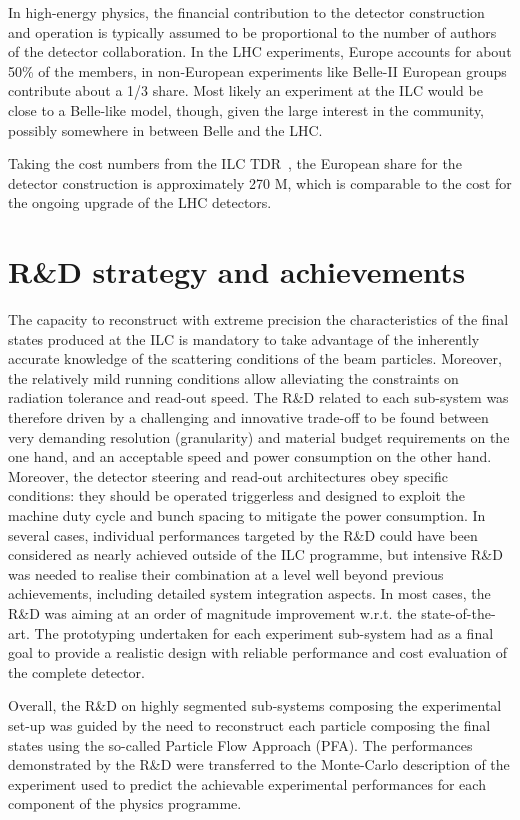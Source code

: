 \documentclass[%
 reprint,
 amsmath,amssymb,
 aps,
]{revtex4-1}
\begin{document}
In high-energy physics, the financial contribution to the detector
construction and operation
is typically assumed to be proportional to the number of authors of
the detector collaboration. In the LHC experiments, Europe accounts for about 50\% of the members, in non-European experiments like Belle-II European groups contribute about a 1/3 share. Most likely an experiment at the ILC would be close to a Belle-like model, though, given the large interest in the community, possibly somewhere in between Belle and the LHC. 

Taking
the cost numbers from
the ILC TDR~\cite{ILC-TDR}, the European share for the detector
construction is approximately 270 M\Euro{}, which is comparable to the cost for the ongoing upgrade of the LHC detectors.

\section{\label{sec:RandD}R\&D strategy and achievements}

The capacity to reconstruct with extreme precision the characteristics of the ﬁnal states produced at the ILC is mandatory to take advantage of the inherently accurate knowledge of the scattering conditions of the beam particles. Moreover, the relatively mild running conditions allow alleviating the constraints on radiation tolerance and read-out speed. The R\&D related to each sub-system was therefore driven by a challenging and innovative trade-oﬀ to be found between very demanding resolution (granularity) and material budget requirements on the one hand, and an acceptable speed and power consumption on the other hand. Moreover, the detector steering and read-out architectures obey speciﬁc conditions: they should be operated triggerless and designed to exploit the machine duty cycle and bunch spacing to mitigate the power consumption.
In several cases, individual performances targeted by the R\&D could have been considered as nearly achieved outside of the ILC programme, but intensive R\&D was needed to realise their combination at a level well beyond previous achievements, including detailed system integration aspects. In most cases, the R\&D was aiming at an order of magnitude improvement w.r.t. the state-of-the-art. The prototyping undertaken for each experiment sub-system had as a ﬁnal goal to provide a realistic design with reliable performance and cost evaluation of the complete detector.

Overall, the R\&D on highly segmented sub-systems composing the experimental set-up was guided by the need to reconstruct each particle composing the ﬁnal states using the so-called Particle Flow Approach (PFA). The performances demonstrated by the R\&D were transferred to the Monte-Carlo description of the experiment used to predict the achievable experimental performances for each component of the physics programme.
\end{document}
